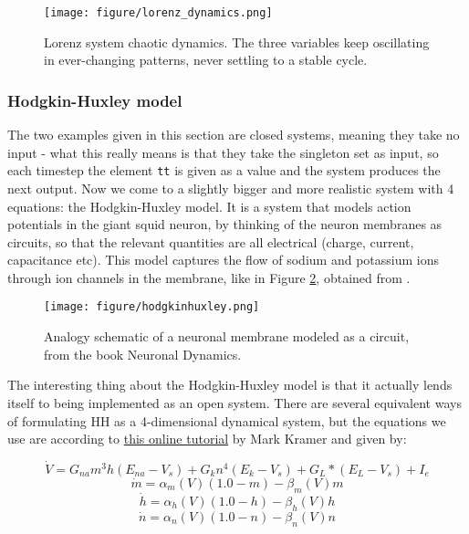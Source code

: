 \begin{figure}
    \centering
    \texttt{[image: figure/lorenz\_dynamics.png]}
    \caption{Lorenz system chaotic dynamics. The three variables keep oscillating in ever-changing patterns, never settling to a stable cycle.}
    \label{fig:lorenz_dynamics}
\end{figure}


\subsubsection{Hodgkin-Huxley model}
\label{section:hh}
The two examples given in this section are closed systems, meaning they take no input - what this really means is that they take the singleton set as input, so each timestep the element \texttt{tt} is given as a value and the system produces the next output. Now we come to a slightly bigger and more realistic system with 4 equations: the Hodgkin-Huxley \cite{hodgkin1952quantitative} model. It is a system that models action potentials in the giant squid neuron, by thinking of the neuron membranes as circuits, so that the relevant quantities are all electrical (charge, current, capacitance etc). This model captures the flow of sodium and potassium ions through ion channels in the membrane, like in Figure \ref{fig:hodgkinhuxleyschematic}, obtained from \cite{gerstner2014neuronal}.

\begin{figure}
    \centering
    \texttt{[image: figure/hodgkinhuxley.png]}
    \caption{Analogy schematic of a neuronal membrane modeled as a circuit, from the book Neuronal Dynamics.}
    \label{fig:hodgkinhuxleyschematic}
\end{figure}

The interesting thing about the Hodgkin-Huxley model is that it actually lends itself to being implemented as an open system. There are several equivalent ways of formulating HH as a 4-dimensional dynamical system, but the equations we use are according to \href{https://mark-kramer.github.io/Case-Studies-Python/HH.html}{this online tutorial} by Mark Kramer and given by:

\begin{equation}
\dot{V} =  G_{na}m^3h(E_{na} - V_s) + G_kn^4(E_k - V_s) + G_L * (E_L - V_s) + I_e
\label{eq:voltage}
\end{equation}
\begin{equation}
\dot{m} = \alpha_m(V)(1.0 - m) - \beta_m(V)m
\label{eq:mhh}
\end{equation}
\begin{equation}
\dot{h} = \alpha_h(V)(1.0 - h) - \beta_h(V)h
\label{eq:hhh}
\end{equation}
\begin{equation}
\dot{n} = \alpha_n(V)(1.0 - n) - \beta_n(V)n   
\label{eq:nhh}
\end{equation}


